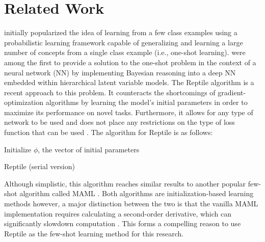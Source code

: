 \documentclass[a4paper]{book}
\begin{document}
\chapter{Related Work}\label{chap:theoretical_framework}

\textcite{lake_human-level_2015} initially popularized the idea of learning from a few class examples using a probabilistic learning framework capable of generalizing and learning a large number of concepts from a single class example (i.e., one-shot learning). \textcite{rezende_one-shot_2016} were among the first to provide a solution to the one-shot problem in the context of a neural network (NN) by implementing Bayesian reasoning into a deep NN embedded within hierarchical latent variable models. The Reptile algorithm \parencite{nichol_first-order_2018} is a recent approach to this problem. It counteracts the shortcomings of gradient-optimization algorithms by learning the model's initial parameters in order to maximize its performance on novel tasks. Furthermore, it allows for any type of network to be used and does not place any restrictions on the type of loss function that can be used \parencite{nichol_first-order_2018}. The algorithm for Reptile is as follows:

\IncMargin{1em}
\begin{algorithm}
Initialize $\phi$, the vector of initial parameters


\caption{Reptile (serial version)}
\label{alg:reptile}
\end{algorithm}
\DecMargin{1em}

Although simplistic, this algorithm reaches similar results to another popular few-shot algorithm called MAML \parencite{finn_model-agnostic_2017}. Both algorithms are initialization-based learning methods however, a major distinction between the two is that the vanilla MAML implementation requires calculating a second-order derivative, which can significantly slowdown computation \parencite{nichol_first-order_2018}. This forms a compelling reason to use Reptile as the few-shot learning method for this research.
\end{document}

